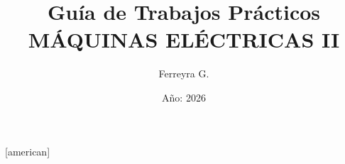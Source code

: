 \usepackage[utf8]{inputenc}
\usepackage[spanish]{babel}
\usepackage{circuitikz}[american]
\usepackage{amsmath}
\usepackage{pgfplots}
\usepackage{sectsty}
\usepackage{newtxtext,newtxmath}
\usepackage[formato]{toolsgf}
\usepackage{titlesec}


\allsectionsfont{\sffamily}
\pgfplotsset{compat=1.7}

\newcommand{\materia}{MÁQUINAS  ELÉCTRICAS II}
\newcommand{\TP}{}
\newcommand{\logo}{images/4124}
\newcommand{\email}{gustavoferreyra@outlook.com}
\newcommand{\classroomcode}{bskt3vj}
\newcommand{\urlqr}{https://www.merin.edu.ar/}

\title{\Huge Guía de Trabajos Prácticos\\\textbf{\materia}}
\author{Ferreyra G.}
\date{Año: 2026}

\sectionfont{\sffamily}
\subsectionfont{\sffamily}


